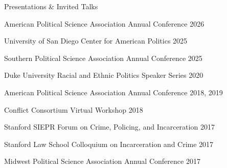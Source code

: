 \documentclass{resume} %
\begin{document}
	 








\begin{rSection}{Presentations \& Invited Talks}

{American Political Science Association Annual Conference} \hfill {2026}

{University of San Diego Center for American Politics}  \hfill {2025}

{Southern Political Science Association Annual Conference} \hfill {2025}

{Duke University Racial and Ethnic Politics Speaker Series} \hfill{2020}

{American Political Science Association Annual Conference} \hfill {2018, 2019}

{Conflict Consortium Virtual Workshop} \hfill {2018}

{Stanford SIEPR Forum on Crime, Policing, and Incarceration} \hfill {2017}


{Stanford Law School Colloquium on Incarceration and Crime} \hfill {2017}

{Midwest Political Science Association Annual Conference} \hfill {2017} \\
\end{rSection}
\end{document}
